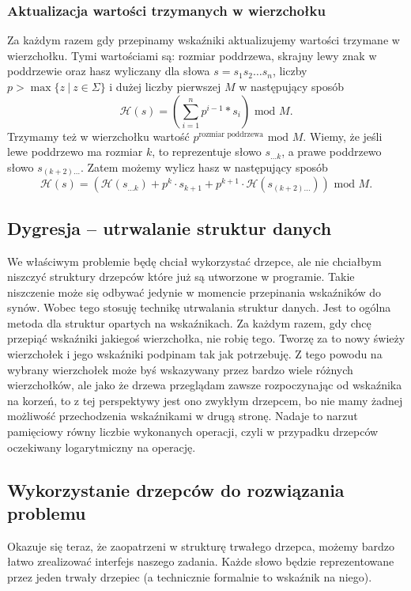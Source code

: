\documentclass[declaration,shortabstract]{iithesis}
\theoremstyle{definition} \newtheorem{definition}{Definicja}[chapter]
\theoremstyle{remark} \newtheorem{remark}[definition]{Obserwacja}
\theoremstyle{plain} \newtheorem{theorem}[definition]{Twierdzenie}
\theoremstyle{remark} \newtheorem{example}{Przykład}[definition]
\theoremstyle{plain} \newtheorem{lemma}[definition]{Lemat}
\begin{document}
\subsubsection{Aktualizacja wartości trzymanych w wierzchołku}

Za każdym razem gdy przepinamy wskaźniki aktualizujemy wartości trzymane w wierzchołku. Tymi wartościami są: rozmiar poddrzewa, skrajny lewy znak w poddrzewie oraz hasz wyliczany dla słowa $s = s_1 s_2 \ldots s_n$, liczby $p > \max \{ z\ |\ z \in \Sigma \}$ i dużej liczby pierwszej $M$ w następujący sposób $$\mathcal{H}(s) = (\sum_{i=1}^n p^{i-1}*s_i) \text{ mod } M.$$ Trzymamy też w wierzchołku wartość $p^{\text{rozmiar poddrzewa}} \text{ mod } M$. Wiemy, że jeśli lewe poddrzewo ma rozmiar $k$, to reprezentuje słowo $s_{\ldots k}$, a prawe poddrzewo słowo $s_{(k + 2) \ldots}$. Zatem możemy wylicz hasz w następujący sposób $$ \mathcal{H}(s) = (\mathcal{H}(s_{\ldots k}) + p^k \cdot s_{k+1} + p^{k+1} \cdot \mathcal{H}(s_{(k+2) \ldots})) \text{ mod } M. $$

\subsection{Dygresja -- utrwalanie struktur danych}

We właściwym problemie będę chciał wykorzystać drzepce, ale nie chciałbym niszczyć struktury drzepców które już są utworzone w programie. Takie niszczenie może się odbywać jedynie w momencie przepinania wskaźników do synów. Wobec tego stosuję technikę utrwalania struktur danych. Jest to ogólna metoda dla struktur opartych na wskaźnikach. Za każdym razem, gdy chcę przepiąć wskaźniki jakiegoś wierzchołka, nie robię tego. Tworzę za to nowy świeży wierzchołek i jego wskaźniki podpinam tak jak potrzebuję. Z tego powodu na wybrany wierzchołek może byś wskazywany przez bardzo wiele różnych wierzchołków, ale jako że drzewa przeglądam zawsze rozpoczynając od wskaźnika na korzeń, to z tej perspektywy jest ono zwykłym drzepcem, bo nie mamy żadnej możliwość przechodzenia wskaźnikami w drugą stronę. Nadaje to narzut pamięciowy równy liczbie wykonanych operacji, czyli w przypadku drzepców oczekiwany logarytmiczny na operację.

\subsection{Wykorzystanie drzepców do rozwiązania problemu}

Okazuje się teraz, że zaopatrzeni w strukturę trwałego drzepca, możemy bardzo łatwo zrealizować interfejs naszego zadania. Każde słowo będzie reprezentowane przez jeden trwały drzepiec (a technicznie formalnie to wskaźnik na niego). 
\end{document}
